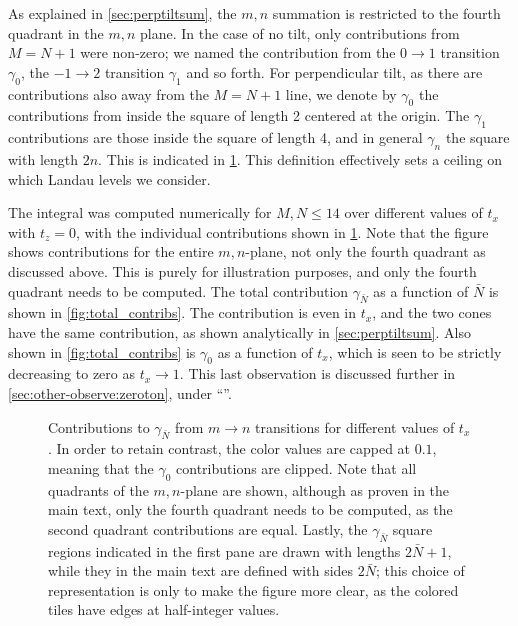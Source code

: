 As explained in \cref{sec:perptiltsum}, the \( m,n \) summation is restricted to the fourth quadrant in the \( m,n \) plane.
In the case of no tilt, only contributions from \( M = N + 1 \) were non-zero;
we named the contribution from the \( 0\to 1 \) transition \( \gamma_0 \), the \( -1\to 2 \) transition \( \gamma_1 \) and so forth.
For perpendicular tilt, as there are contributions also away from the \( M=N + 1 \) line, we denote by \( \gamma_0 \) the contributions from inside the square of length 2 centered at the origin.
The \( \gamma_1 \) contributions are those inside the square of length 4, and in general \( \gamma_n \) the square with length \( 2 n \).
This is indicated in \cref{fig:contribs}.
This definition effectively sets a ceiling on which Landau levels we consider.

The integral was computed numerically for \( M,N \leq 14 \) over different values of \( t_x \) with \( t_z = 0 \), with the individual contributions shown in \cref{fig:contribs}.
Note that the figure shows contributions for the entire \( m,n \)-plane, not only the fourth quadrant as discussed above.
This is purely for illustration purposes, and only the fourth quadrant needs to be computed.
The total contribution \( \gamma_{\bar{N}} \) as a function of \( \bar{N} \) is shown in \cref{fig:total_contribs}.
The contribution is even in \( t_x \), and the two cones have the same contribution, as shown analytically in \cref{sec:perptiltsum}.
Also shown in \cref{fig:total_contribs} is \( \gamma_0 \) as a function of \( t_x \), which is seen to be strictly decreasing to zero as \( t_x \to 1 \).
This last observation is discussed further in \cref{sec:other-observe:zeroton}, under
``''.

\begin{figure}[htb]
  \centering
  
  \caption{Contributions to \( \gamma_{\bar{N}} \) from \( m\to n \) transitions for different values of \( t_x \).
    In order to retain contrast, the color values are capped at \( 0.1 \), meaning that the \( \gamma_0 \) contributions are clipped.
    Note that all quadrants of the \( m,n \)-plane are shown, although as proven in the main text, only the fourth quadrant needs to be computed, as the second quadrant contributions are equal.
    Lastly, the \( \gamma_{\bar{N}} \) square regions indicated in the first pane are drawn with lengths \( 2 \bar{N} + 1 \), while they in the main text are defined with sides \( 2 \bar{N} \);
    this choice of representation is only to make the figure more clear, as the colored tiles have edges at half-integer values.%
    \label{fig:contribs}}
\end{figure}

